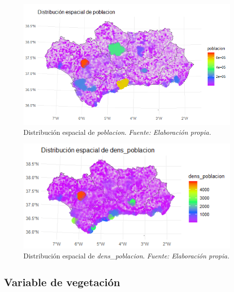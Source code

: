 \documentclass[12pt,a4paper,]{book}
\numberwithin{dummy}{section}
\theoremstyle{ocrenumbox}
\theoremstyle{blacknumex}
\theoremstyle{blacknumbox}
\theoremstyle{ocrenum}
\theoremstyle{ocrenum}
\begin{document}
\begin{figure}[H]
\centering
\includegraphics[width = \textwidth]{graficos/poblacion_spat.png}
\caption[Distribución espacial de \textit{poblacion}]{Distribución espacial de \textit{poblacion}. \it Fuente: Elaboración propia.}
\label{fig:poblacion_spat}
\end{figure}

\begin{figure}[H]
\centering
\includegraphics[width = \textwidth]{graficos/dens_poblacion_spat.png}
\caption[Distribución espacial de \textit{dens\_poblacion}]{Distribución espacial de \textit{dens\_poblacion}. \it Fuente: Elaboración propia.}
\label{fig:dens_poblacion_spat}
\end{figure}

\hypertarget{variable-de-vegetaciuxf3n}{%
\subsection{Variable de vegetación}\label{variable-de-vegetaciuxf3n}}
\end{document}
